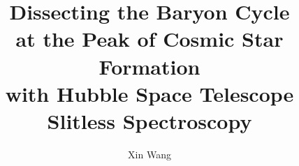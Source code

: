 \documentclass[PhD]{uclathes}
\title          {Dissecting the Baryon Cycle\\
                 at the Peak of Cosmic Star Formation\\
                 with Hubble Space Telescope Slitless Spectroscopy}
\author         {Xin Wang}
\begin{document}
\makeintropages

%

%
%
%



\end{document}

